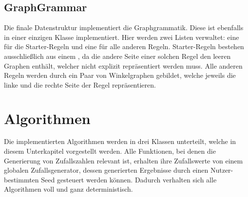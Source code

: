 \subsection{GraphGrammar}
Die finale Datenstruktur implementiert die Graphgrammatik. Diese ist ebenfalls in einer einzigen Klasse  implementiert.
Hier werden zwei Listen verwaltet: eine für die Starter-Regeln und eine für alle anderen Regeln. Starter-Regeln bestehen ausschließlich
aus einem , da die andere Seite einer solchen Regel den leeren Graphen enthält, welcher nicht explizit repräsentiert
werden muss. Alle anderen Regeln werden durch ein Paar von Winkelgraphen gebildet, welche jeweils die linke und die rechte Seite der
Regel repräsentieren. 

\section{Algorithmen}
Die implementierten Algorithmen werden in drei Klassen unterteilt, welche in diesem Unterkapitel vorgestellt werden. Alle Funktionen,
bei denen die Generierung von Zufallszahlen relevant ist, erhalten ihre Zufallswerte von einem globalen Zufallsgenerator, dessen
generierten Ergebnisse durch einen Nutzer-bestimmten Seed gesteuert werden können. Dadurch verhalten sich alle Algorithmen voll
und ganz deterministisch.

